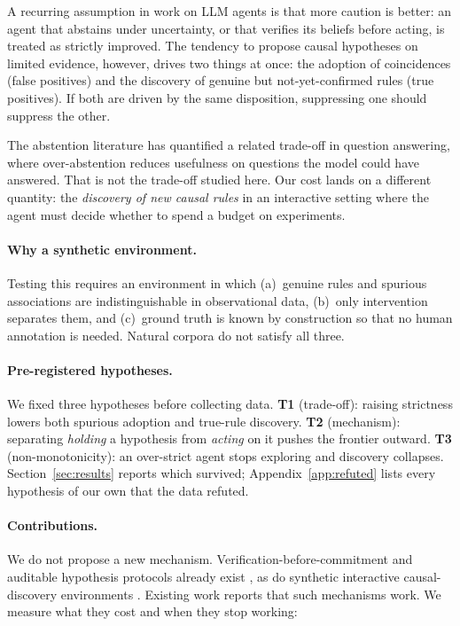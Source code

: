 \documentclass[11pt]{article}
\begin{document}
A recurring assumption in work on LLM agents is that more caution is better: an agent that
abstains under uncertainty, or that verifies its beliefs before acting, is treated as
strictly improved. The tendency to propose causal hypotheses on limited evidence, however,
drives two things at once: the adoption of coincidences (false positives) and the discovery
of genuine but not-yet-confirmed rules (true positives). If both are driven by the same
disposition, suppressing one should suppress the other.

The abstention literature has quantified a related trade-off in question answering, where
over-abstention reduces usefulness on questions the model could have answered. That is not
the trade-off studied here. Our cost lands on a different quantity: the \emph{discovery of
new causal rules} in an interactive setting where the agent must decide whether to spend a
budget on experiments.

\paragraph{Why a synthetic environment.} Testing this requires an environment in which
(a)~genuine rules and spurious associations are indistinguishable in observational data,
(b)~only intervention separates them, and (c)~ground truth is known by construction so that
no human annotation is needed. Natural corpora do not satisfy all three.

\paragraph{Pre-registered hypotheses.} We fixed three hypotheses before collecting data.
\textbf{T1} (trade-off): raising strictness lowers both spurious adoption and true-rule
discovery. \textbf{T2} (mechanism): separating \emph{holding} a hypothesis from
\emph{acting} on it pushes the frontier outward. \textbf{T3} (non-monotonicity): an
over-strict agent stops exploring and discovery collapses. Section~\ref{sec:results}
reports which survived; Appendix~\ref{app:refuted} lists every hypothesis of our own that
the data refuted.

\paragraph{Contributions.} We do not propose a new mechanism. Verification-before-commitment
and auditable hypothesis protocols already exist \cite{saver,hep}, as do synthetic
interactive causal-discovery environments \cite{causalab,interventional}. Existing work
reports that such mechanisms work. We measure what they cost and when they stop working:
\end{document}

